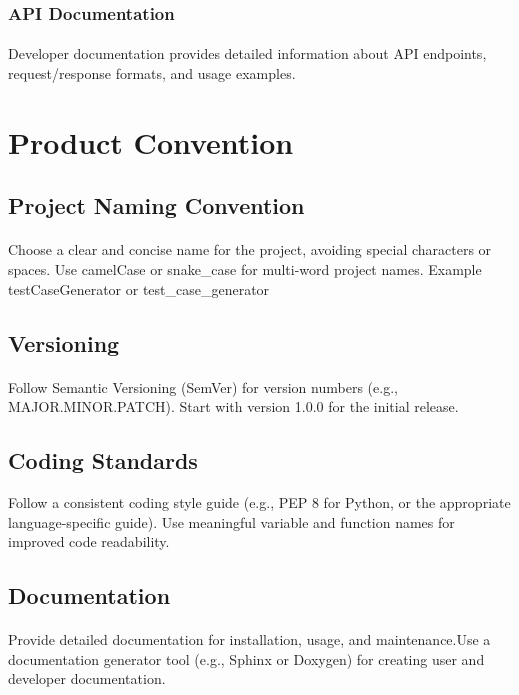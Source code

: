 \documentclass{article}
\begin{document}
\subsubsection{API Documentation}
\paragraph{}
Developer documentation provides detailed information about API endpoints,
request/response formats, and usage examples.


\section{Product Convention}
\subsection{Project Naming Convention}
\paragraph{}
Choose a clear and concise name for the project, avoiding special characters or spaces.
Use camelCase or snake\_case for multi-word project names.
Example\: testCaseGenerator or test\_case\_generator

\subsection{Versioning}
\paragraph{}
Follow Semantic Versioning (SemVer) for version numbers (e.g., MAJOR.MINOR.PATCH).
Start with version 1.0.0 for the initial release.

\subsection{Coding Standards}
Follow a consistent coding style guide (e.g., PEP 8 for Python, or the appropriate
language-specific guide). Use meaningful variable and function names for improved
code readability.

\subsection{Documentation}
\paragraph{}
Provide detailed documentation for installation, usage, and maintenance.Use a
documentation generator tool (e.g., Sphinx or Doxygen) for creating user and developer
documentation.
\end{document}
